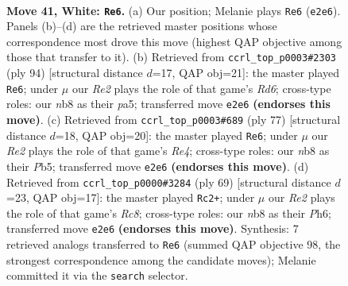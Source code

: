 \documentclass[11pt]{article}
\begin{document}
\clearpage

\begin{figure}[p]\centering
\begin{subfigure}{0.46\textwidth}\centering
\resizebox{\linewidth}{!}{%
\newchessgame
\chessboard[
  setfen={1n3k1r/8/1p1p4/1P1P4/p1p3P1/7P/1P2R3/2K5 w - - 11 41},
  showmover=false,
  pgfstyle=straightmove, color=movearrow, markmove={e2-e6}
]}
\caption{}
\end{subfigure}\hfill
\begin{subfigure}{0.46\textwidth}\centering
\resizebox{\linewidth}{!}{%
\newchessgame
\chessboard[
  setfen={8/1r4k1/3R4/p1p1p3/2P5/PP3P1p/5K2/8 w - - 0 48},
  showmover=false,
  pgfstyle=straightmove, color=movearrow, markmove={d6-e6}
]}
\caption{}
\end{subfigure}
\\[4pt]
\begin{subfigure}{0.46\textwidth}\centering
\resizebox{\linewidth}{!}{%
\newchessgame
\chessboard[
  setfen={6k1/6p1/p1P5/1p1pr1pP/8/2P5/P7/3K2R1 b - - 0 39},
  showmover=false,
  pgfstyle=straightmove, color=movearrow, markmove={e5-e6}
]}
\caption{}
\end{subfigure}\hfill
\begin{subfigure}{0.46\textwidth}\centering
\resizebox{\linewidth}{!}{%
\newchessgame
\chessboard[
  setfen={8/4k3/4p2p/6p1/R3p1P1/4P3/1P3K1P/2r5 b - - 2 35},
  showmover=false,
  pgfstyle=straightmove, color=movearrow, markmove={c1-c2}
]}
\caption{}
\end{subfigure}
\caption{\textbf{Move 41, White: \texttt{Re6}.} (a) Our position; Melanie plays \texttt{Re6} (\texttt{e2e6}). Panels (b)--(d) are the retrieved master positions whose correspondence most drove this move (highest QAP objective among those that transfer to it). (b) Retrieved from \texttt{ccrl\_top\_p0003\#2303} (ply 94) [structural distance $d$=17, QAP obj=21]: the master played \texttt{Re6}; under $\mu$ our \emph{Re2} plays the role of that game's \emph{Rd6}; cross-type roles: our \emph{n}b8 as their \emph{p}a5; transferred move \texttt{e2e6} \textbf{(endorses this move)}. (c) Retrieved from \texttt{ccrl\_top\_p0003\#689} (ply 77) [structural distance $d$=18, QAP obj=20]: the master played \texttt{Re6}; under $\mu$ our \emph{Re2} plays the role of that game's \emph{Re4}; cross-type roles: our \emph{n}b8 as their \emph{P}b5; transferred move \texttt{e2e6} \textbf{(endorses this move)}. (d) Retrieved from \texttt{ccrl\_top\_p0000\#3284} (ply 69) [structural distance $d$=23, QAP obj=17]: the master played \texttt{Rc2+}; under $\mu$ our \emph{Re2} plays the role of that game's \emph{Rc8}; cross-type roles: our \emph{n}b8 as their \emph{P}h6; transferred move \texttt{e2e6} \textbf{(endorses this move)}. Synthesis: 7 retrieved analogs transferred to \texttt{Re6} (summed QAP objective 98, the strongest correspondence among the candidate moves); Melanie committed it via the \texttt{search} selector.}
\label{fig:thought-m80}
\end{figure}
\end{document}
